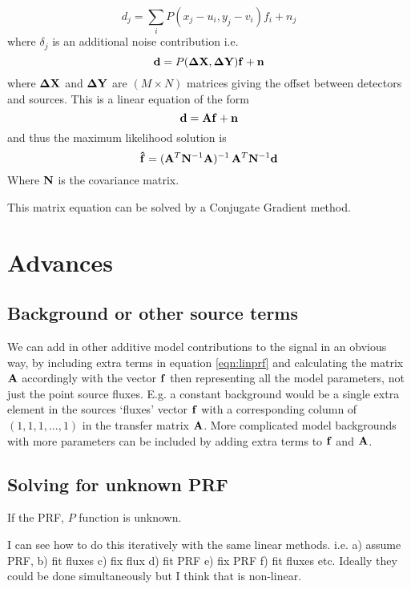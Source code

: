 \documentclass{article}
\begin{document}
\begin{equation}
 d_j=\sum_i{P(x_j-u_i, y_j-v_i)}f_i+n_j \label{eqn:lin1}
 \end{equation}
where $\delta_j$ is an additional noise contribution
i.e.
\begin{equation}
{\bf d}=P({\bf \Delta X},{\bf \Delta Y}){\bf f}+{\bf n}
\label{eqn:linprf}\end{equation}
where ${\bf {\Delta X}}$ and ${\bf \Delta Y}$ are $(M\times N)$ matrices giving the offset between detectors and sources.  This is a linear equation of the form
\begin{equation}
  {\bf d}={\bf A}{\bf f}+{\bf n}\label{eqn:matrix}
\end{equation}
and thus the maximum likelihood solution is
\begin{equation}
 {\bf \hat{f}}=({\bf A}^T{\bf N}^{-1}{\bf A})^{-1}\, {\bf A}^T{\bf N}^{-1}{\bf 
d}
\end{equation}
Where ${\bf N}$ is the covariance matrix.


This matrix equation can be solved by a Conjugate Gradient method.

\section{Advances}
\subsection{Background or other source terms}
We can add in other additive model contributions to the signal in an obvious way, by including extra terms in equation \ref{eqn:linprf} and calculating the matrix ${\bf A}$ accordingly with the vector ${\bf f}$ then representing all the model parameters, not just the point source fluxes.  E.g. a constant background would be a single extra element in the sources `fluxes' vector ${\bf f}$ with a corresponding column of $(1,1,1,...,1)$ in the transfer matrix ${\bf A}$. More complicated model backgrounds with more parameters can be included by adding extra terms to ${\bf f}$ and ${\bf A}$.
\subsection{Solving for unknown PRF}
If the PRF, $P$ function is unknown.

 I can see how to do this iteratively with the same linear methods.  i.e. a) assume PRF, b) fit fluxes c) fix flux d) fit PRF e) fix PRF f) fit fluxes etc.  Ideally they could be done simultaneously  but I think that is non-linear.
 
\end{document}
